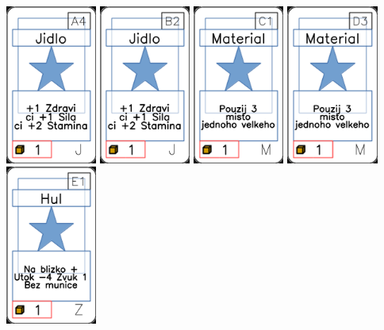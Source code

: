 \documentclass[a4paper]{article}
\begin{document}
	\includegraphics[width=3.0cm]{img-1_3}
	\includegraphics[width=3.0cm]{img-1_6}
	\includegraphics[width=3.0cm]{img-1_40}
	\includegraphics[width=3.0cm]{img-1_47}
	\includegraphics[width=3.0cm]{img-1_80}
\end{document}
